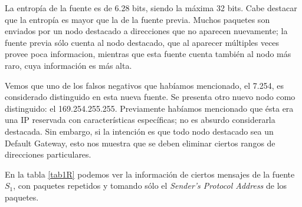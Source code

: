 \par La entropía de la fuente es de 6.28 bits, siendo la máxima 32 bits. 
Cabe destacar que la entropía es mayor que la de la fuente previa.
Muchos paquetes son enviados por un nodo destacado a direcciones que no aparecen nuevamente; la fuente previa sólo cuenta al nodo destacado, que al aparecer múltiples veces provee poca informacion, mientras que esta fuente cuenta también al nodo más raro, cuya información es más alta.

\par Vemos que uno de los falsos negativos que habíamos mencionado, el 7.254, es considerado distinguido en esta nueva fuente.
Se presenta otro nuevo nodo como distinguido: el 169.254.255.255. 
Previamente habíamos mencionado que ésta era una IP reservada con características específicas; no es absurdo considerarla destacada. 
Sin embargo, si la intención es que todo nodo destacado sea un Default Gateway, esto nos muestra que se deben eliminar ciertos rangos de direcciones particulares.

\par En la tabla \ref{tab1R} podemos ver la información de ciertos mensajes de la fuente $S_1$, con paquetes repetidos y tomando sólo el \textit{Sender's Protocol Address} de los paquetes.

